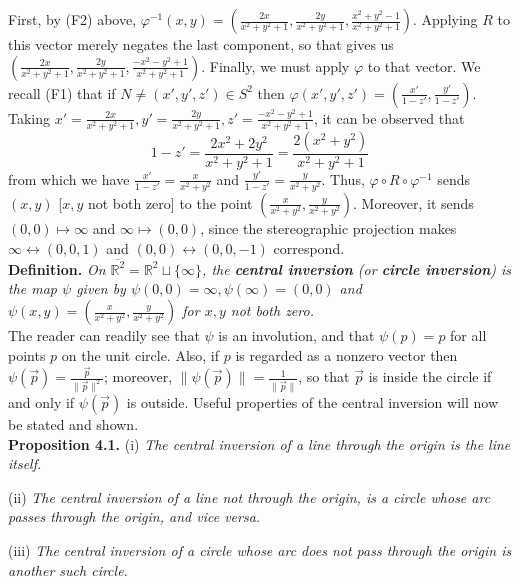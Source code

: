 \documentclass[leqno]{book}
\begin{document}
First, by (F2) above, $\varphi^{-1}(x,y)=\left(\frac{2x}{x^2+y^2+1},\frac{2y}{x^2+y^2+1},\frac{x^2+y^2-1}{x^2+y^2+1}\right)$.  Applying $R$ to this vector merely negates the last component, so that gives us $\left(\frac{2x}{x^2+y^2+1},\frac{2y}{x^2+y^2+1},\frac{-x^2-y^2+1}{x^2+y^2+1}\right)$.
Finally, we must apply $\varphi$ to that vector.  We recall (F1) that if $N\ne(x',y',z')\in S^2$ then $\varphi(x',y',z')=\left(\frac{x'}{1-z'},\frac{y'}{1-z'}\right)$.  Taking $x'=\frac{2x}{x^2+y^2+1},y'=\frac{2y}{x^2+y^2+1},z'=\frac{-x^2-y^2+1}{x^2+y^2+1}$, it can be observed that
$$1-z'=\frac{2x^2+2y^2}{x^2+y^2+1}=\frac{2(x^2+y^2)}{x^2+y^2+1}$$
from which we have $\frac{x'}{1-z'}=\frac x{x^2+y^2}$ and $\frac{y'}{1-z'}=\frac y{x^2+y^2}$.  Thus, $\varphi\circ R\circ\varphi^{-1}$ sends $(x,y)$ [$x,y$ not both zero] to the point $\left(\frac x{x^2+y^2},\frac y{x^2+y^2}\right)$.  Moreover, it sends $(0,0)\mapsto\infty$ and $\infty\mapsto(0,0)$, since the stereographic projection makes $\infty\leftrightarrow(0,0,1)$ and $(0,0)\leftrightarrow(0,0,-1)$ correspond.\\

\noindent\textbf{Definition.} \emph{On $\overline{\mathbb R^2}=\mathbb R^2\sqcup\{\infty\}$, the \textbf{central inversion} (or \textbf{circle inversion}) is the map $\psi$ given by $\psi(0,0)=\infty,\psi(\infty)=(0,0)$ and $\psi(x,y)=\left(\frac x{x^2+y^2},\frac y{x^2+y^2}\right)$ for $x,y$ not both zero.}\\

\noindent The reader can readily see that $\psi$ is an involution, and that $\psi(p)=p$ for all points $p$ on the unit circle.  Also, if $p$ is regarded as a nonzero vector then $\psi(\vec p)=\frac{\vec p}{\|\vec p\|^2}$; moreover, $\|\psi(\vec p)\|=\frac 1{\|\vec p\|}$, so that $\vec p$ is inside the circle if and only if $\psi(\vec p)$ is outside.  Useful properties of the central inversion will now be stated and shown.\\

\noindent\textbf{Proposition 4.1.} (i) \emph{The central inversion of a line through the origin is the line itself.}

(ii) \emph{The central inversion of a line not through the origin, is a circle whose arc passes through the origin, and vice versa.}

(iii) \emph{The central inversion of a circle whose arc does not pass through the origin is another such circle.}
\end{document}
